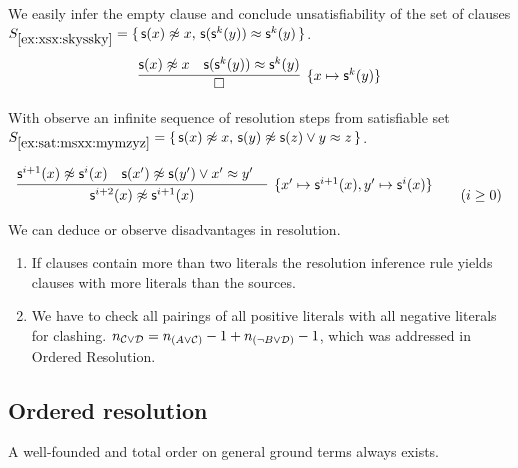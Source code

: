 \begin{example}\label{ex:xsx:skyssky}
	We easily infer the empty clause and 
	conclude unsatisfiability of the set of clauses
	$S_{\ref{ex:xsx:skyssky}} = \{\,
	{ {\mathsf s}(x)\not\approx x},\, 
	{ {\mathsf s}({\mathsf s}^k(y))\approx{\mathsf s}^k(y) }
	\,\}$.
	\begin{gather*}
	\infer[\{ x\mapsto\msucc^k(y) \}]
	{
		\square
	}
	{
		\msucc(x)\mNE x & \msucc(\msucc^k(y))\mEQ\msucc^k(y)
	}
	\end{gather*}
\end{example}

\begin{example}\label{ex:sat:msxx:mymzyz}
	With observe an infinite sequence of resolution steps from satisfiable set 
	$S_{\ref{ex:sat:msxx:mymzyz}} = \{\, {\mathsf s}(x)\not\approx x,\, {\mathsf s}(y)\not\approx{\mathsf s}(z) \lor y\approx z
	\,\}$.
	
	\begin{gather*}
	\infer
	[\{ x'\mapsto\msucc^{i+1}(x), y'\mapsto\msucc^{i}(x)\}]
	{
		\msucc^{i+2}(x) \mNE\msucc^{i+1}(x)  
	}{
		\msucc^{i+1}(x)\mNE \msucc^i(x) & \msucc(x')\mNE\msucc(y')\lor x'\mEQ y'
		&
	}
	\tag{$i\geq 0$}
	\end{gather*}
\end{example}

We can deduce or observe disadvantages in resolution. 

\begin{enumerate}
	\item If clauses contain more than two literals the resolution inference rule yields clauses with more literals than the sources.
	\item We have to check all pairings 
	of all positive literals with all negative literals for clashing.
	$n_{{\mathcal C}\lor{\mathcal D}} = n_{(A\lor{\mathcal C})} -1 + n_{(\lnot B\lor{\mathcal D})}-1$,
	which was addressed in Ordered Resolution.
\end{enumerate}

\subsection{Ordered resolution}

\begin{lemma}A well-founded and total order on general ground terms always exists.\end{lemma}


